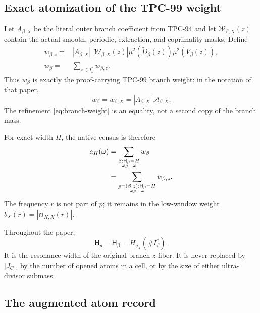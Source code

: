 \subsection{Exact atomization of the TPC-99 weight}

Let \(A_{\beta,X}\) be the literal outer branch coefficient from
TPC-94 and let \(\mathcal W_{\beta,X}(z)\) contain the actual smooth,
periodic, extraction, and coprimality masks.  Define
\begin{align}
 w_{\beta,z}
 ={}&
 |A_{\beta,X}|\,
 |\mathcal W_{\beta,X}(z)|
 \mu^2(\widetilde D_\beta(z))
 \mu^2(V_\beta(z)),
\label{eq:atom-weight}\\
 w_\beta
 ={}&
 \sum_{z\in I_\beta^\ast}w_{\beta,z}.
\label{eq:branch-weight}
\end{align}
Thus \(w_\beta\) is exactly the proof-carrying TPC-99 branch weight:
in the notation of that paper,
\[
 w_\beta=w_{\beta,X}
 =|A_{\beta,X}|\,\mathcal A_{\beta,X}.
\]
The refinement \eqref{eq:branch-weight} is an equality, not a second
copy of the branch mass.

For exact width \(H\), the native census is therefore
\begin{align}
 a_H(\omega)
 &=
 \sum_{\substack{\beta:
       \mathsf H_\beta=H\\\omega_\beta=\omega}}w_\beta
\notag\\
 &=
 \sum_{\substack{p=(\beta,z):
       \mathsf H_\beta=H\\\omega_\beta=\omega}}w_{\beta,z}.
\label{eq:atomized-census}
\end{align}
The frequency \(r\) is not part of \(p\); it remains in the
low-window weight \(b_X(r)=|\mathfrak m_{K,X}(r)|\).

\begin{remark}
\label{rem:width-not-cell}
Throughout the paper,
\[
 \mathsf H_p=\mathsf H_\beta=H_{q_X}(\#I_\beta^\ast).
\]
It is the resonance width of the original branch \(z\)-fiber.  It
is never replaced by \(|J_C|\), by the number of opened atoms in a
cell, or by the size of either ultra-divisor submass.
\end{remark}

\subsection{The augmented atom record}

